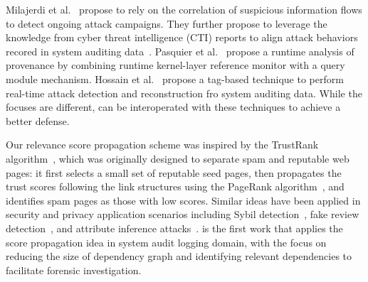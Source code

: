 Milajerdi et al.~\cite{HOLMES} propose to rely on the correlation of suspicious information flows to detect ongoing attack campaigns.
They further propose to leverage the knowledge from cyber threat intelligence (CTI) reports to align attack behaviors recored in system auditing data~\cite{poirot}. 
Pasquier et al.~\cite{pasquier2018runtime} propose a runtime analysis of provenance by combining runtime kernel-layer reference monitor with a query module mechanism. 
Hossain et al.~\cite{sleuth} propose a tag-based technique to perform real-time attack detection and reconstruction fro system auditing data. 
While the focuses are different, \tool can be interoperated with these techniques to achieve a better defense.








Our relevance score propagation scheme was inspired by the TrustRank algorithm~\cite{Gyongyi:2004:vldb}, which was originally designed to separate spam and reputable web pages: it first selects a small set of reputable seed pages, then propagates the trust scores following the link structures using the PageRank algorithm~\cite{Page:techreport:1998}, and identifies spam pages as those with low scores. Similar ideas have been applied in security and privacy application scenarios
including Sybil detection~\cite{cao2012sybilrank,Gong:2014:tifs,gao2018sybilfuse}, fake review detection~\cite{Rayana:2015:COS:2783258.2783370}, and attribute inference attacks~\cite{jia2017attriinfer}.
%
\tool is the first work that applies the score propagation idea in system audit logging domain, with the focus on reducing the size of dependency graph and identifying relevant dependencies to facilitate forensic investigation.


